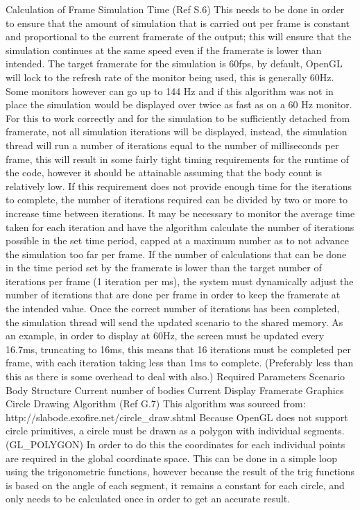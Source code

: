 Calculation of Frame Simulation Time (Ref S.6)
This needs to be done in order to ensure that the amount of simulation that is carried out per frame is constant and proportional to the current framerate of the output; this will ensure that the simulation continues at the same speed even if the framerate is lower than intended.
The target framerate for the simulation is 60fps, by default, OpenGL will lock to the refresh rate of the monitor being used, this is generally 60Hz. Some monitors however can go up to 144 Hz and if this algorithm was not in place the simulation would be displayed over twice as fast as on a 60 Hz monitor.
For this to work correctly and for the simulation to be sufficiently detached from framerate, not all simulation iterations will be displayed, instead, the simulation thread will run a number of iterations equal to the number of milliseconds per frame, this will result in some fairly tight timing requirements for the runtime of the code, however it should be attainable assuming that the body count is relatively low.
If this requirement does not provide enough time for the iterations to complete, the number of iterations required can be divided by two or more to increase time between iterations.
It may be necessary to monitor the average time taken for each iteration and have the algorithm calculate the number of iterations possible in the set time period, capped at a maximum number as to not advance the simulation too far per frame.
If the number of calculations that can be done in the time period set by the framerate  is lower than the target number of iterations per frame (1 iteration per ms), the system must dynamically adjust the number of iterations that are done per frame in order to keep the framerate at the intended value.
Once the correct number of iterations has been completed, the simulation thread will send the updated scenario to the shared memory.
As an example, in order to display at 60Hz, the screen must be updated every 16.7ms, truncating to 16ms, this means that 16 iterations must be completed per frame, with each iteration taking less than 1ms to complete. (Preferably less than this as there is some overhead to deal with also.)
Required Parameters
Scenario Body Structure
Current number of bodies
Current Display Framerate
Graphics
Circle Drawing Algorithm (Ref G.7)
This algorithm was sourced from: http://slabode.exofire.net/circle_draw.shtml
Because OpenGL does not support circle primitives, a circle must be drawn as a polygon with individual segments. (GL_POLYGON)
In order to do this the coordinates for each individual points are required in the global coordinate space.
This can be done in a simple loop using the trigonometric functions, however because the result of the trig functions is based on the angle of each segment, it remains a constant for each circle, and only needs to be calculated once in order to get an accurate result.

